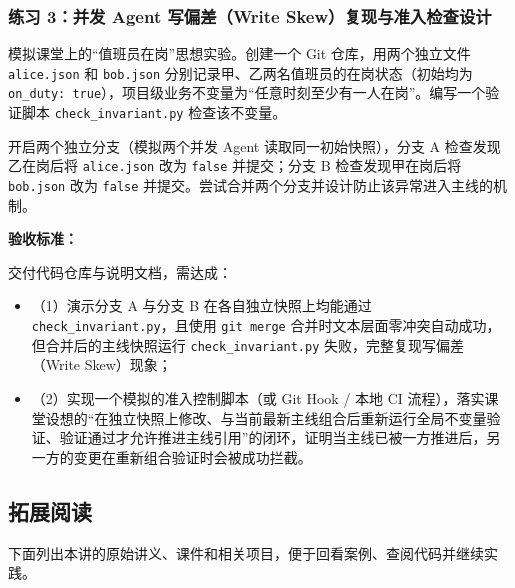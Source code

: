 \documentclass[UTF8,a4paper,11pt,fontset=fandol]{ctexart}
\begin{document}
\subsubsection*{练习 3：并发 Agent 写偏差（Write Skew）复现与准入检查设计}

模拟课堂上的“值班员在岗”思想实验。创建一个 Git 仓库，用两个独立文件 \texttt{alice.json} 和 \texttt{bob.json} 分别记录甲、乙两名值班员的在岗状态（初始均为 \texttt{on\_duty: true}），项目级业务不变量为“任意时刻至少有一人在岗”。编写一个验证脚本 \texttt{check\_invariant.py} 检查该不变量。

开启两个独立分支（模拟两个并发 Agent 读取同一初始快照），分支 A 检查发现乙在岗后将 \texttt{alice.json} 改为 \texttt{false} 并提交；分支 B 检查发现甲在岗后将 \texttt{bob.json} 改为 \texttt{false} 并提交。尝试合并两个分支并设计防止该异常进入主线的机制。

\par{}\textbf{验收标准：}

交付代码仓库与说明文档，需达成：

\begin{itemize}
\item （1）演示分支 A 与分支 B 在各自独立快照上均能通过 \texttt{check\_invariant.py}，且使用 \texttt{git merge} 合并时文本层面零冲突自动成功，但合并后的主线快照运行 \texttt{check\_invariant.py} 失败，完整复现写偏差（Write Skew）现象；

\item （2）实现一个模拟的准入控制脚本（或 Git Hook / 本地 CI 流程），落实课堂设想的“在独立快照上修改、与当前最新主线组合后重新运行全局不变量验证、验证通过才允许推进主线引用”的闭环，证明当主线已被一方推进后，另一方的变更在重新组合验证时会被成功拦截。
\end{itemize}

\subsection{拓展阅读}

下面列出本讲的原始讲义、课件和相关项目，便于回看案例、查阅代码并继续实践。
\end{document}
